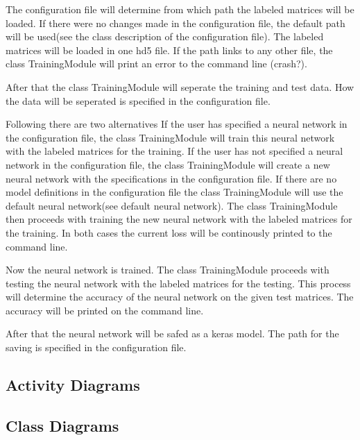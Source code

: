 \documentclass[parskip=full]{scrartcl}
\begin{document}
The configuration file will determine from which path the labeled matrices will be loaded.
If there were no changes made in the configuration file, the default path will be used(see the class description of the configuration file).
The labeled matrices will be loaded in one hd5 file. If the path links to any other file, the class TrainingModule will print an error to the command line (crash?). \newline

After that the class TrainingModule will seperate the training and test data.
How the data will be seperated is specified in the configuration file.\newline

Following there are two alternatives
 If the user has specified a neural network in the configuration file, the class TrainingModule will train this neural network with the labeled matrices for the training.
If the user has not specified a neural network in the configuration file, the class TrainingModule will create a new neural network with the specifications in the configuration file.
If there are no model definitions in the configuration file the class TrainingModule will use the default neural network(see default neural network).
The class TrainingModule then proceeds with training the new neural network with the labeled matrices for the training. In both cases the current loss will be continously printed to the command line.\newline

Now the neural network is trained. The class TrainingModule proceeds with testing the neural network with the labeled matrices for the testing.
This process will determine the accuracy of the neural network on the given test matrices.
The accuracy will be printed on the command line.\newline

After that the neural network will be safed as a keras model.
The path for the saving is specified in the configuration file.

\subsection{Activity Diagrams}



\subsection{Class Diagrams}
\end{document}
